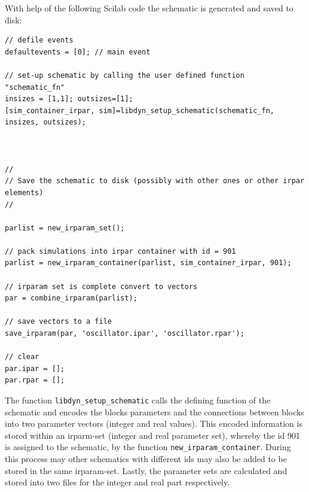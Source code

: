 \documentclass[%
	pdftex,%
	a4paper,%
	oneside,%
	11pt,%
	halfparskip,%
	headsepline,%
	bibtotocnumbered,%
	idxtotoc%
]{scrartcl}
\begin{document}
With help of the following Scilab code the schematic is generated and saved to disk:  

\begin{verbatim}
// defile events
defaultevents = [0]; // main event

// set-up schematic by calling the user defined function "schematic_fn"
insizes = [1,1]; outsizes=[1];
[sim_container_irpar, sim]=libdyn_setup_schematic(schematic_fn, insizes, outsizes);



//
// Save the schematic to disk (possibly with other ones or other irpar elements)
//

parlist = new_irparam_set();

// pack simulations into irpar container with id = 901
parlist = new_irparam_container(parlist, sim_container_irpar, 901);

// irparam set is complete convert to vectors
par = combine_irparam(parlist);

// save vectors to a file
save_irparam(par, 'oscillator.ipar', 'oscillator.rpar');

// clear
par.ipar = [];
par.rpar = [];
\end{verbatim}

The function \texttt{libdyn\_setup\_schematic} calls the defining function of the schematic and encodes the blocks parameters and the connections between blocks into two parameter vectors (integer and real values). This encoded information is stored within an irparm-set (integer and real parameter set), whereby the id 901 is assigned to the schematic, by the function \texttt{new\_irparam\_container}. During this process may other schematics with different ids may also be added to be stored in the same irparam-set. Lastly, the parameter sets are calculated and stored into two files for the integer and real part respectively.

% 
% 
% 
% 


\end{document}
